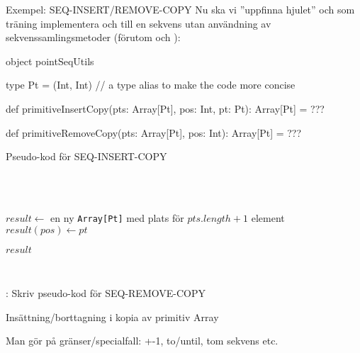 \begin{Slide}{Exempel: SEQ-INSERT/REMOVE-COPY}
Nu ska vi ''uppfinna hjulet'' och som träning implementera  och  till en  sekvens utan användning av sekvenssamlingsmetoder (förutom  och ):
\begin{Code}
object pointSeqUtils {
  type Pt = (Int, Int)  // a type alias to make the code more concise

  def primitiveInsertCopy(pts: Array[Pt], pos: Int, pt: Pt): Array[Pt] = ???

  def primitiveRemoveCopy(pts: Array[Pt], pos: Int): Array[Pt] = ???
}
\end{Code}
\end{Slide}




\begin{Slide}{Pseudo-kod för SEQ-INSERT-COPY}\SlideFontSmall
\begin{algorithm}[H]

  ~\\

 \noindent\hrulefill\\
 $result \leftarrow$ en ny \texttt{Array[Pt]} med plats för $pts.length + 1$ element \\
 $result(pos) \leftarrow pt$ \\

 \Return $result$

  \noindent\hrulefill\\
\end{algorithm}
\pause\vspace{0.5em}: Skriv pseudo-kod för SEQ-REMOVE-COPY
\end{Slide}

\begin{Slide}{Insättning/borttagning i kopia av primitiv Array}
\vspace{-0.6em}

\pause
\SlideFontSmall Man gör  på gränser/specialfall: +-1, to/until, tom sekvens etc.
\end{Slide}

